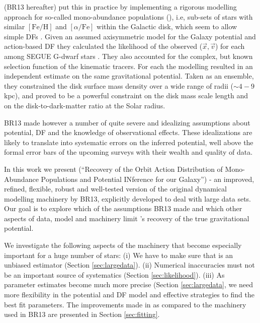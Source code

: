 \citet{2013ApJ...779..115B} (BR13 hereafter) put this in practice by implementing a rigorous modelling approach for so-called mono-abundance populations (\MAPs{}), i.e, sub-sets of stars with similar $[\mathrm{Fe}/\mathrm{H}]$ and $[\alpha/\mathrm{Fe}]$ within the Galactic disk, which seem to allow simple DFs \citep{bov12b,bov12c,2012ApJ...753..148B}. Given an assumed axisymmetric model for the Galaxy potential and action-based DF \citep{2010MNRAS.401.2318B,2011MNRAS.413.1889B,2013MNRAS.434..652T} they calculated the likelihood of the observed ($\vec{x},\vec{v}$) for each \MAP{} among SEGUE G-dwarf stars \citep{2009AJ....137.4377Y}. They also accounted for the complex, but known selection function \citep{2012ApJ...753..148B} of the kinematic tracers. For each \MAP{} the modelling resulted in an independent estimate on the same gravitational potential. Taken as an ensemble, they constrained the disk surface mass density over a wide range of radii ($\sim 4-9$ kpc), and proved to be a powerful constraint on the disk mass scale length and on the disk-to-dark-matter ratio at the Solar radius. 

BR13 made however a number of quite severe and idealizing assumptions about potential, DF and the knowledge of observational effects. These idealizations are likely to translate into systematic errors on the inferred potential, well above the formal error bars of the upcoming surveys with their wealth and quality of data.

In this work we present \RM{} (``\textsc{R}ecovery of the \textsc{O}rbit \textsc{A}ction \textsc{D}istribution of \textsc{M}ono-\textsc{A}bundance \textsc{P}opulations and \textsc{P}otential \textsc{IN}ference for our \textsc{G}alaxy'') - an improved, refined, flexible, robust and well-tested version of the original dynamical modelling machinery by BR13, explicitly developed to deal with large data sets. Our goal is to explore which of the assumptions BR13 made and which other aspects of data, model and machinery limit \RM{}'s recovery of the true gravitational potential.

We investigate the following aspects of the \RM{} machinery that become especially important for a huge number of stars: (i) We have to make sure that \RM{} is an unbiased estimator (Section \ref{sec:largedata}). (ii) Numerical inaccuracies must not be an important source of systematics (Section \ref{sec:likelihood}). (iii) As parameter estimates become much more precise (Section \ref{sec:largedata}, we need more flexibility in the potential and DF model and effective strategies to find the best fit parameters. The improvements made in \RM{} as compared to the machinery used in BR13 are presented in Section \ref{sec:fitting}.

